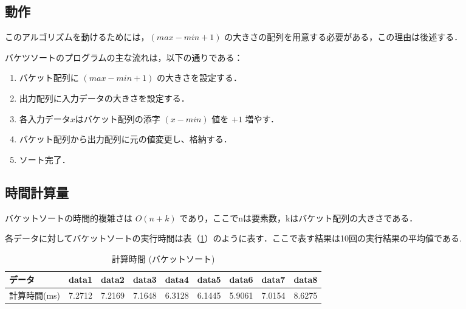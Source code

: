 \documentclass[a4j, titlepage]{jarticle}
\begin{document}
        \subsection{動作}
            このアルゴリズムを動けるためには，$(max - min + 1)$ の大きさの配列を用意する必要がある，この理由は後述する．
            
            バケツソートのプログラムの主な流れは，以下の通りである：
            \begin{enumerate}
                \item バケット配列に $(max - min + 1)$ の大きさを設定する．
                \item 出力配列に入力データの大きさを設定する．
                \item 各入力データ$x$はバケット配列の添字 $(x - min)$ 値を $+1$ 増やす．
                \item バケット配列から出力配列に元の値変更し、格納する．
                \item ソート完了．
            \end{enumerate}

        \subsection{時間計算量}
            バケットソートの時間的複雑さは $O(n + k)$ であり，ここでnは要素数，kはバケット配列の大きさである．

            各データに対してバケットソートの実行時間は表（\ref{tab:bucket}）のように表す．ここで表す結果は10回の実行結果の平均値である.

            \begin{table}[tbh]
                \caption{計算時間 (バケットソート)}
                \label{tab:bucket}
                \begin{center}
                    \begin{tabular}{|l|cccccccc|}
                        \hline
                        データ & data1 & data2 &data3 &data4 &data5 &data6 &data7 &data8\\ \hline
                        計算時間(ms) & 7.2712 & 7.2169 & 7.1648 & 6.3128 & 6.1445 & 5.9061 & 7.0154 & 8.6275\\ \hline
                    \end{tabular}
                \end{center}
            \end{table}
\end{document}
